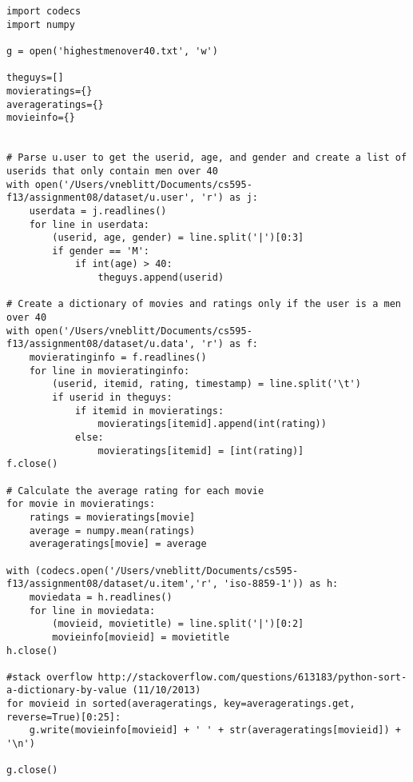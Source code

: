 \documentclass{article}
\begin{document}
\begin{lstlisting}[frame=single, caption=highestmenover40.py, label=highestmenover40]
import codecs
import numpy

g = open('highestmenover40.txt', 'w')

theguys=[]
movieratings={}
averageratings={}
movieinfo={}


# Parse u.user to get the userid, age, and gender and create a list of userids that only contain men over 40
with open('/Users/vneblitt/Documents/cs595-f13/assignment08/dataset/u.user', 'r') as j:
	userdata = j.readlines()
	for line in userdata:
		(userid, age, gender) = line.split('|')[0:3]
		if gender == 'M':
			if int(age) > 40:
				theguys.append(userid)

# Create a dictionary of movies and ratings only if the user is a men over 40
with open('/Users/vneblitt/Documents/cs595-f13/assignment08/dataset/u.data', 'r') as f:
	movieratinginfo = f.readlines()
	for line in movieratinginfo:
		(userid, itemid, rating, timestamp) = line.split('\t')
		if userid in theguys:
			if itemid in movieratings:
				movieratings[itemid].append(int(rating))
			else:
				movieratings[itemid] = [int(rating)]
f.close()

# Calculate the average rating for each movie
for movie in movieratings:
	ratings = movieratings[movie]
	average = numpy.mean(ratings)
	averageratings[movie] = average

with (codecs.open('/Users/vneblitt/Documents/cs595-f13/assignment08/dataset/u.item','r', 'iso-8859-1')) as h:
	moviedata = h.readlines()
	for line in moviedata:
		(movieid, movietitle) = line.split('|')[0:2]
		movieinfo[movieid] = movietitle
h.close()

#stack overflow http://stackoverflow.com/questions/613183/python-sort-a-dictionary-by-value (11/10/2013)
for movieid in sorted(averageratings, key=averageratings.get, reverse=True)[0:25]:
	g.write(movieinfo[movieid] + ' ' + str(averageratings[movieid]) + '\n')

g.close()
\end{lstlisting}
\end{document}
